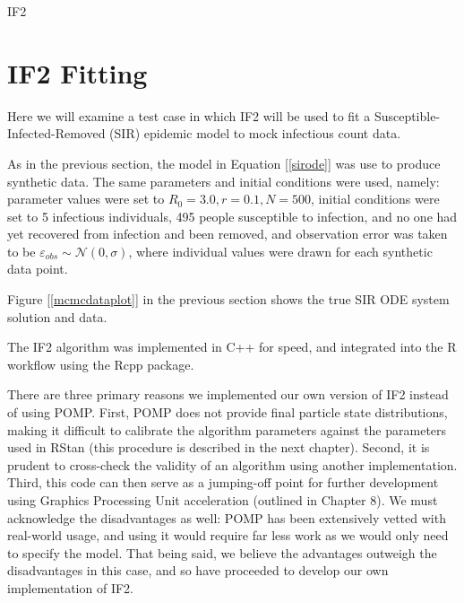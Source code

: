 \begin{algorithm}
{{	        }

	        \BlankLine


	    }

        \BlankLine


        \BlankLine

        \caption{IF2 \label{if2}}

    \end{algorithm}


\section{IF2 Fitting}

    Here we will examine a test case in which IF2 will be used to fit a Susceptible-Infected-Removed (SIR) epidemic model to mock infectious count data.

    As in the previous section, the model in Equation [\ref{sirode}] was use to produce synthetic data. The same parameters and initial conditions were used, namely: parameter values were set to $R_0 = 3.0, r = 0.1, N = 500$, initial conditions were set to 5 infectious individuals, 495 people susceptible to infection, and no one had yet recovered from infection and been removed, and observation error was taken to be $\varepsilon_{obs} \sim \mathcal{N}(0,\sigma)$, where individual values were drawn for each synthetic data point.

    Figure [\ref{mcmcdataplot}] in the previous section shows the true SIR ODE system solution and data.

    The IF2 algorithm was implemented in C++ for speed, and integrated into the R workflow using the Rcpp package.

    There are three primary reasons we implemented our own version of IF2 instead of using POMP. First, POMP does not provide final particle state distributions, making it difficult to calibrate the algorithm parameters against the parameters used in RStan (this procedure is described in the next chapter). Second, it is prudent to cross-check the validity of an algorithm using another implementation. Third, this code can then serve as a jumping-off point for further development using Graphics Processing Unit acceleration (outlined in Chapter 8). We must acknowledge the disadvantages as well: POMP has been extensively vetted with real-world usage, and using it would require far less work as we would only need to specify the model. That being said, we believe the advantages outweigh the disadvantages in this case, and so have proceeded to develop our own implementation of IF2.
	
